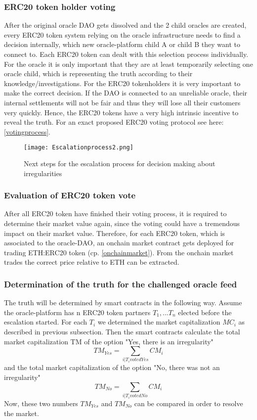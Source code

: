 \documentclass[a4paper]{article}
\begin{document}
\subsubsection{ERC20 token holder voting}
After the original oracle DAO gets dissolved and the 2 child oracles are created, every ERC20 token system relying on the oracle infrastructure needs to find a decision internally, which new oracle-platform child A or child B they want to connect to. Each ERC20 token can dealt with this selection process individually. For the oracle it is only important that they are at least temporarily selecting one oracle child, which is representing the truth according to their knowledge/investigations.  For the ERC20 tokenholders it is very important to make the correct decision. If the DAO is connected to an unreliable oracle, their internal settlements will not be fair and thus they will lose all their customers very quickly. Hence, the ERC20 tokens have a very high intrinsic incentive to reveal the truth. 
For an exact proposed ERC20 voting protocol see here: \ref{votingprocess}.
\begin{figure}
\centering
\texttt{[image: Escalationprocess2.png]}
\caption{\label{fig:escalation2}Next steps for the escalation process for decision making about irregularities}
\end{figure}
\subsubsection{Evaluation of ERC20 token vote}
After all ERC20 token have finished their voting process, it is required to determine their market value again, since the voting could have a tremendous impact on their market value. Therefore, for each ERC20 token, which is associated to the oracle-DAO, an onchain market contract gets deployed for trading ETH:ERC20 token (cp. \ref{onchainmarket}). From the onchain market trades the correct price relative to ETH can be extracted.
\subsubsection{Determination of the truth for the challenged oracle feed}
The truth will be determined by smart contracts in the following way. Assume the oracle-platform has n ERC20 token partners $T_1, ... T_n$ elected before the escalation started. For each $T_i$ we determined the market capitalization $MC_i$ as described in previous subsection.
Then the smart contracts calculate the total market capitalization TM of the option "Yes, there is an irregularity"
$$ TM_{Yes}=\sum_{i| T_i voted Yes} CM_i \label{eqdecision}$$
and the total market capitalization of the option "No, there was not an irregularity"
$$ TM_{No}=\sum_{i| T_i voted No} CM_i$$
Now, these two numbers $TM_{Yes}$ and $TM_{No}$ can be compared in order to resolve the market.
\end{document}
